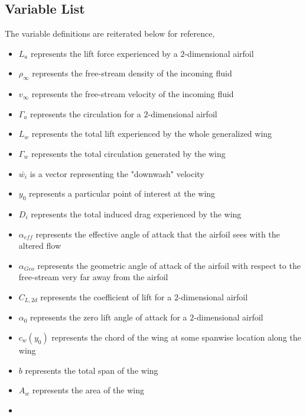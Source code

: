 \documentclass[a4paper, 12pt]{report}
\begin{document}
\begin{center}
\subsection{Variable List}
\begin{comment}
\end{comment}
The variable definitions are reiterated below for reference,
\begin{itemize}
\item $L_{a}$ represents the lift force experienced by a $2$-dimensional airfoil
\item $\rho_{\infty}$ represents the free-stream density of the incoming fluid
\item $v_{\infty}$ represents the free-stream velocity of the incoming fluid
\item $\Gamma_{a}$ represents the circulation for a $2$-dimensional airfoil
\item $L_{w}$ represents the total lift experienced by the whole generalized wing
\item $\Gamma_{w}$ represents the total circulation generated by the wing
\item $\bar{w_{i}}$ is a vector representing the "downwash" velocity
\item $y_{0}$ represents a particular point of interest at the wing
\item $D_{i}$ represents the total induced drag experienced by the wing
\item $\alpha_{eff}$ represents the effective angle of attack that the airfoil sees with the altered flow
\item $\alpha_{Geo}$ represents the geometric angle of attack of the airfoil with respect to the free-stream very far away from the airfoil
\item $C_{L,2d}$ represents the coefficient of lift for a $2$-dimensional airfoil
\item $\alpha_{0}$ represents the zero lift angle of attack for a $2$-dimensional airfoil
\item $c_{w}(y_{0})$ represents the chord of the wing at some spanwise location along the wing
\item $b$ represents the total span of the wing
\item $A_{w}$ represents the area of the wing
\item 
\end{itemize}



\end{center}
\end{document}
